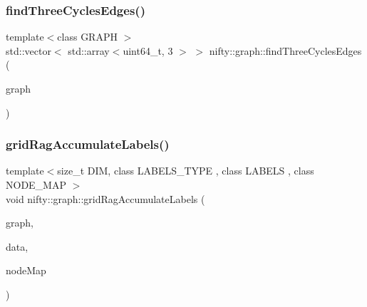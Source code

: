 \mbox{\label{namespacenifty_1_1graph_ad3135898f4d621d7b498e65c7b5f38c1}} 
\subsubsection{\texorpdfstring{find\+Three\+Cycles\+Edges()}{findThreeCyclesEdges()}\hspace{0.1cm}{\footnotesize\ttfamily [2/2]}}
{\footnotesize\ttfamily template$<$class G\+R\+A\+PH $>$ \\
std\+::vector$<$ std\+::array$<$uint64\+\_\+t, 3 $>$ $>$ nifty\+::graph\+::find\+Three\+Cycles\+Edges (\begin{DoxyParamCaption}\item[{const G\+R\+A\+PH \&}]{graph }\end{DoxyParamCaption})}

\mbox{\label{namespacenifty_1_1graph_a079406a55f43b7ea55616943a3bc6fff}} 
\subsubsection{\texorpdfstring{grid\+Rag\+Accumulate\+Labels()}{gridRagAccumulateLabels()}}
{\footnotesize\ttfamily template$<$size\+\_\+t D\+IM, class L\+A\+B\+E\+L\+S\+\_\+\+T\+Y\+PE , class L\+A\+B\+E\+LS , class N\+O\+D\+E\+\_\+\+M\+AP $>$ \\
void nifty\+::graph\+::grid\+Rag\+Accumulate\+Labels (\begin{DoxyParamCaption}\item[{const \hyperlink{namespacenifty_1_1graph_a45cca2dcd061996d13ec8e6bb8afb200}{Explicit\+Labels\+Grid\+Rag}$<$ D\+IM, L\+A\+B\+E\+L\+S\+\_\+\+T\+Y\+PE $>$ \&}]{graph,  }\item[{\hyperlink{classandres_1_1View}{nifty\+::marray\+::\+View}$<$ L\+A\+B\+E\+LS $>$}]{data,  }\item[{N\+O\+D\+E\+\_\+\+M\+AP \&}]{node\+Map }\end{DoxyParamCaption})}

\mbox{\label{namespacenifty_1_1graph_aca62625e3c61b810e2f6cda338de2c26}} 
